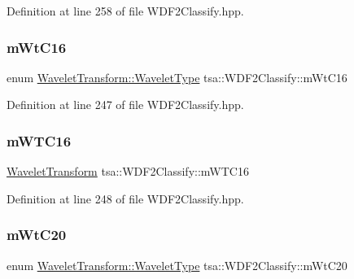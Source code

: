 Definition at line 258 of file W\+D\+F2\+Classify.\+hpp.

\mbox{\label{classtsa_1_1_w_d_f2_classify_a86fd375260ff0a37e35a907faef1aece}} 
\subsubsection{\texorpdfstring{m\+Wt\+C16}{mWtC16}}
{\footnotesize\ttfamily enum \hyperlink{classtsa_1_1_wavelet_transform_a5a529de70e0004333fcf23b9cca88ce7}{Wavelet\+Transform\+::\+Wavelet\+Type} tsa\+::\+W\+D\+F2\+Classify\+::m\+Wt\+C16\hspace{0.3cm}{\ttfamily [private]}}



Definition at line 247 of file W\+D\+F2\+Classify.\+hpp.

\mbox{\label{classtsa_1_1_w_d_f2_classify_af835a72fb26db49ef93cbd021f8e4bdb}} 
\subsubsection{\texorpdfstring{m\+W\+T\+C16}{mWTC16}}
{\footnotesize\ttfamily \hyperlink{classtsa_1_1_wavelet_transform}{Wavelet\+Transform} tsa\+::\+W\+D\+F2\+Classify\+::m\+W\+T\+C16\hspace{0.3cm}{\ttfamily [private]}}



Definition at line 248 of file W\+D\+F2\+Classify.\+hpp.

\mbox{\label{classtsa_1_1_w_d_f2_classify_ad6da16716d8395a4f1369617e21de922}} 
\subsubsection{\texorpdfstring{m\+Wt\+C20}{mWtC20}}
{\footnotesize\ttfamily enum \hyperlink{classtsa_1_1_wavelet_transform_a5a529de70e0004333fcf23b9cca88ce7}{Wavelet\+Transform\+::\+Wavelet\+Type} tsa\+::\+W\+D\+F2\+Classify\+::m\+Wt\+C20\hspace{0.3cm}{\ttfamily [private]}}



